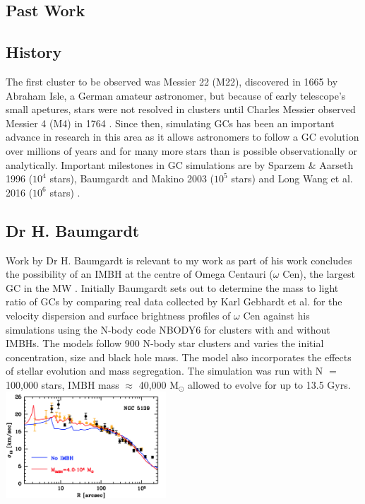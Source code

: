 \documentclass{article}
\begin{document}
\begin{multicols}{2}
\section{Past Work}

\subsection{History}
The first cluster to be observed was Messier 22 (M22), discovered in 1665 by Abraham Isle, a German amateur astronomer, but because of early telescope's small apetures, stars were not resolved in clusters until Charles Messier observed Messier 4 (M4) in 1764 \cite{GCorigins}. Since then, simulating GCs has been an important advance in research in this area as it allows astronomers to follow a GC evolution over millions of years and for many more stars than is possible observationally or analytically. Important milestones in GC simulations are by Sparzem & Aarseth 1996 ($10^4$ stars), Baumgardt and Makino 2003 ($10^5$ stars) \cite{HB} and Long Wang et al. 2016 ($10^6$ stars) \cite{LW}.   

\subsection{Dr H. Baumgardt}
Work by Dr H. Baumgardt is relevant to my work as part of his work concludes the possibility of an IMBH at the centre of Omega Centauri ($\omega$ Cen), the largest GC in the MW \cite{HB}. Initially Baumgardt sets out to determine the mass to light ratio of GCs by comparing real data collected by Karl Gebhardt et al. for the velocity dispersion and surface brightness profiles of $\omega$ Cen against his simulations using the N-body code NBODY6 for clusters with and without IMBHs. The models follow 900 N-body star clusters and varies the initial concentration, size and black hole mass. The model also incorporates the effects of stellar evolution and mass segregation. The simulation was run with N $=$ 100,000 stars, IMBH mass $\approx$ 40,000 M$_{\odot}$ allowed to evolve for up to 13.5 Gyrs.
\vspace{4mm}
    \includegraphics[width=0.45\textwidth]{HB.PNG}
    

\end{multicols}
\end{document}

